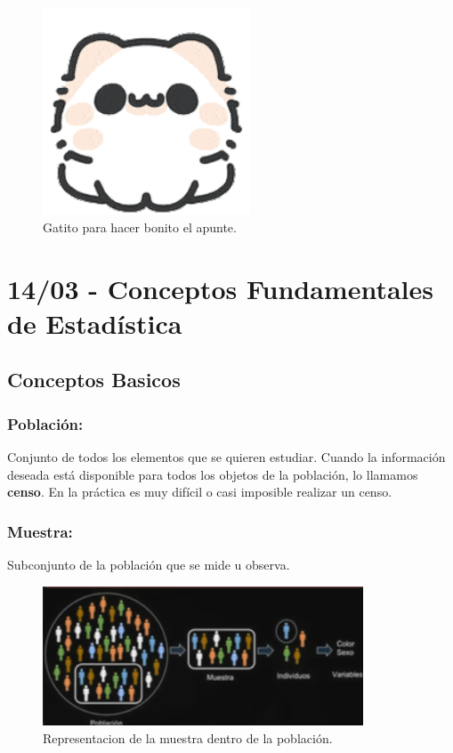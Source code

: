 \documentclass[12pt, letterpaper]{article}
\begin{document}
\begin{figure}[htbp]
	\centering
	\includegraphics[width=0.55\textwidth]{gatito}
	\caption{Gatito para hacer bonito el apunte.}
	\label{fig:gatito}
\end{figure}
\newpage

\tableofcontents
\newpage %

\section{14/03 - Conceptos Fundamentales de Estadística}
\subsection{Conceptos Basicos}
\subsubsection{Población:} %
Conjunto de todos los elementos que se quieren estudiar. Cuando la información deseada está disponible para todos los objetos de la población, lo llamamos \textbf{censo}. En la práctica es muy difícil o casi imposible realizar un censo.

\subsubsection{Muestra:} %
Subconjunto de la población que se mide u observa.

\begin{figure}[h]
	\centering
	\includegraphics[width=0.85\textwidth]{muestra}
	\caption{Representacion de la muestra dentro de la población.}
	\label{fig:muestra}
\end{figure}
\end{document}
